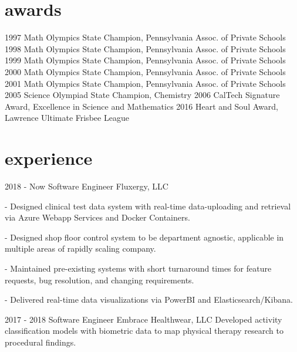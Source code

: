 \documentclass[]{twentysecondcv}
\begin{document}

\section{awards}

\begin{twentyshort}
  \twentyitemshort
    {1997}
    {Math Olympics State Champion, Pennsylvania Assoc. of Private Schools}
  \twentyitemshort
    {1998}
    {Math Olympics State Champion, Pennsylvania Assoc. of Private Schools}
  \twentyitemshort
    {1999}
    {Math Olympics State Champion, Pennsylvania Assoc. of Private Schools}
  \twentyitemshort
    {2000}
    {Math Olympics State Champion, Pennsylvania Assoc. of Private Schools}
  \twentyitemshort
    {2001}
    {Math Olympics State Champion, Pennsylvania Assoc. of Private Schools}
  \twentyitemshort
    {2005}
    {Science Olympiad State Champion, Chemistry}
  \twentyitemshort
    {2006}
    {CalTech Signature Award, Excellence in Science and Mathematics}
  \twentyitemshort
    {2016}
    {Heart and Soul Award, Lawrence Ultimate Frisbee League}
\end{twentyshort}


\section{experience}

\begin{twenty}
  \twentyitem
    {2018 - Now}
    {Software Engineer}
    {Fluxergy, LLC}
    {- Designed clinical test data system with real-time data-uploading and retrieval via Azure Webapp Services and Docker Containers.
	
	- Designed shop floor control system to be department agnostic, applicable in multiple areas of rapidly scaling company.
	
	- Maintained pre-existing systems with short turnaround times for feature requests, bug resolution, and changing requirements.
	
	- Delivered real-time data visualizations via PowerBI and Elasticsearch/Kibana.}
  \twentyitem
    {2017 - 2018}
    {Software Engineer}
    {Embrace Healthwear, LLC}
    {Developed activity classification models with biometric data to map physical therapy research to procedural findings.} 
\end{twenty}
\end{document}
